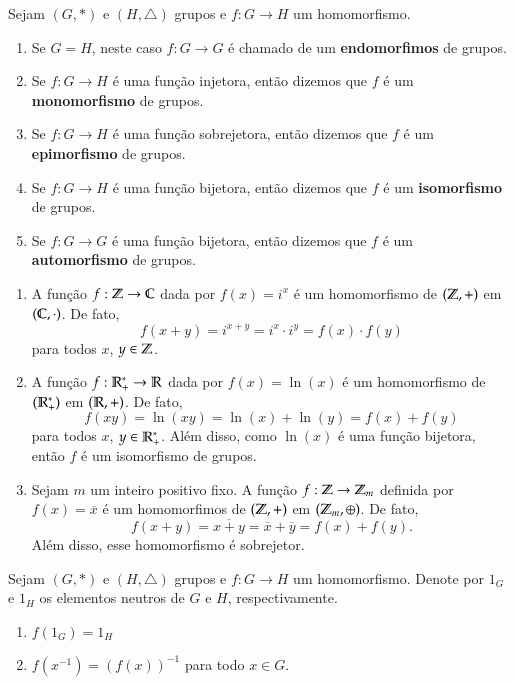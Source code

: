\begin{observacao}
	Sejam $(G, *)$ e $(H, \triangle)$ grupos e $f : G \to H$ um homomorfismo.
	\begin{enumerate}
		\item Se $G = H$, neste caso $f : G \to G$ é chamado de um \textbf{endomorfimos} de grupos.
		\item Se $f : G \to H$ é uma função injetora, então dizemos que $f$ é um \textbf{monomorfismo} de grupos.
		\item Se $f : G \to H$ é uma função sobrejetora, então dizemos que $f$ é um \textbf{epimorfismo} de grupos.
		\item Se $f : G \to H$ é uma função bijetora, então dizemos que $f$ é um \textbf{isomorfismo} de grupos.
		\item Se $f : G \to G$ é uma função bijetora, então dizemos que $f$ é um \textbf{automorfismo} de grupos.
	\end{enumerate}
\end{observacao}

\begin{exemplos}
	\begin{enumerate}
		\item A função $f : \mathbb{Z} \to \mathbb{C}$ dada por $f(x) = i^x$ é um homomorfismo de $(\mathbb{Z}, +)$ em $(\mathbb{C}, \cdot)$. De fato,
		\[
			f(x + y) = i^{x + y} = i^x\cdot i^y = f(x)\cdot f(y)
		\]
		para todos $x$, $y \in \mathbb{Z}$.

		\item A função $f : \mathbb{R}^*_+ \to \mathbb{R}$ dada por $f(x) = \ln(x)$ é um homomorfismo de $(\mathbb{R}^*_+)$ em $(\mathbb{R}, +)$. De fato,
		\[
			f(xy) = \ln(xy) = \ln(x) + \ln(y) = f(x) + f(y)
		\]
		para todos $x$, $y \in \mathbb{R}^*_+$. Além disso, como $\ln(x)$ é uma função bijetora, então $f$ é um isomorfismo de grupos.

		\item Sejam $m$ um inteiro positivo fixo. A função $f: \mathbb{Z} \to \mathbb{Z}_m$ definida por $f(x) = \overline{x}$ é um homomorfimos de $(\mathbb{Z}, +)$ em $(\mathbb{Z}_m, \oplus)$. De fato,
		\[
			f(x + y) = \overline{x + y} = \overline{x} + \overline{y} = f(x) + f(y).
		\]
		Além disso, esse homomorfismo é sobrejetor.
	\end{enumerate}
\end{exemplos}

\begin{proposicao}
	Sejam $(G, *)$ e $(H, \triangle)$ grupos e $f : G \to H$ um homomorfismo. Denote por $1_G$ e $1_H$ os elementos neutros de $G$ e $H$, respectivamente.
	\begin{enumerate}
		\item $f(1_G) = 1_H$
		\item $f(x^{-1}) = (f(x))^{-1}$ para todo $x \in G$.
	\end{enumerate}
\end{proposicao}

